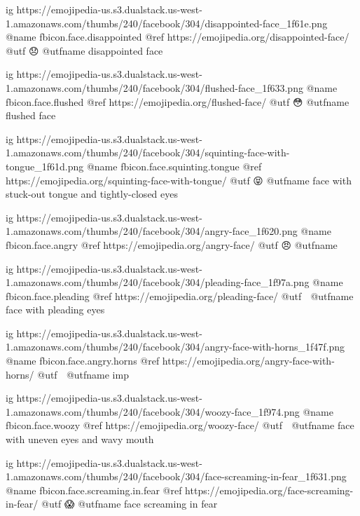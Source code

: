 	ig https://emojipedia-us.s3.dualstack.us-west-1.amazonaws.com/thumbs/240/facebook/304/disappointed-face_1f61e.png
	@name fbicon.face.disappointed
	@ref https://emojipedia.org/disappointed-face/
	@utf 😞
	@utfname disappointed face

	ig https://emojipedia-us.s3.dualstack.us-west-1.amazonaws.com/thumbs/240/facebook/304/flushed-face_1f633.png
	@name fbicon.face.flushed
	@ref https://emojipedia.org/flushed-face/
	@utf 😳
	@utfname flushed face

	ig https://emojipedia-us.s3.dualstack.us-west-1.amazonaws.com/thumbs/240/facebook/304/squinting-face-with-tongue_1f61d.png
	@name fbicon.face.squinting.tongue
	@ref https://emojipedia.org/squinting-face-with-tongue/
	@utf 😝
	@utfname face with stuck-out tongue and tightly-closed eyes

	ig https://emojipedia-us.s3.dualstack.us-west-1.amazonaws.com/thumbs/240/facebook/304/angry-face_1f620.png
	@name fbicon.face.angry
	@ref https://emojipedia.org/angry-face/
	@utf 😠
	@utfname

	ig https://emojipedia-us.s3.dualstack.us-west-1.amazonaws.com/thumbs/240/facebook/304/pleading-face_1f97a.png
	@name fbicon.face.pleading
	@ref https://emojipedia.org/pleading-face/
	@utf 🥺
	@utfname face with pleading eyes

	ig https://emojipedia-us.s3.dualstack.us-west-1.amazonaws.com/thumbs/240/facebook/304/angry-face-with-horns_1f47f.png
	@name fbicon.face.angry.horns
	@ref https://emojipedia.org/angry-face-with-horns/
	@utf 👿
	@utfname imp

	ig https://emojipedia-us.s3.dualstack.us-west-1.amazonaws.com/thumbs/240/facebook/304/woozy-face_1f974.png
	@name fbicon.face.woozy
	@ref https://emojipedia.org/woozy-face/
	@utf 🥴
	@utfname face with uneven eyes and wavy mouth

	ig https://emojipedia-us.s3.dualstack.us-west-1.amazonaws.com/thumbs/240/facebook/304/face-screaming-in-fear_1f631.png
	@name fbicon.face.screaming.in.fear
	@ref https://emojipedia.org/face-screaming-in-fear/
	@utf 😱
	@utfname face screaming in fear

\fi
